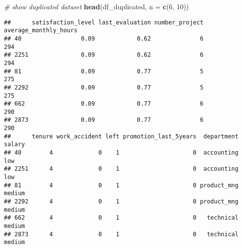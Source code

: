 \documentclass[
]{article}
\newenvironment{Shaded}{\begin{snugshade}}{\end{snugshade}}
\newcommand{\AttributeTok}[1]{\textcolor[rgb]{0.13,0.29,0.53}{#1}}
\newcommand{\CommentTok}[1]{\textcolor[rgb]{0.56,0.35,0.01}{\textit{#1}}}
\newcommand{\DecValTok}[1]{\textcolor[rgb]{0.00,0.00,0.81}{#1}}
\newcommand{\FunctionTok}[1]{\textcolor[rgb]{0.13,0.29,0.53}{\textbf{#1}}}
\newcommand{\NormalTok}[1]{#1}
\newcommand{\OtherTok}[1]{\textcolor[rgb]{0.56,0.35,0.01}{#1}}
\newcommand{\SpecialCharTok}[1]{\textcolor[rgb]{0.81,0.36,0.00}{\textbf{#1}}}
\newcommand{\StringTok}[1]{\textcolor[rgb]{0.31,0.60,0.02}{#1}}
\begin{document}
\begin{Shaded}
\end{Shaded}

\begin{Shaded}
\begin{Highlighting}[]
\CommentTok{\# show duplicated dataset}
\FunctionTok{head}\NormalTok{(df\_duplicated, }\AttributeTok{n =} \FunctionTok{c}\NormalTok{(}\DecValTok{6}\NormalTok{, }\DecValTok{10}\NormalTok{))}
\end{Highlighting}
\end{Shaded}

\begin{verbatim}
##      satisfaction_level last_evaluation number_project average_monthly_hours
## 40                 0.09            0.62              6                   294
## 2251               0.09            0.62              6                   294
## 81                 0.09            0.77              5                   275
## 2292               0.09            0.77              5                   275
## 662                0.09            0.77              6                   290
## 2873               0.09            0.77              6                   290
##      tenure work_accident left promotion_last_5years  department salary
## 40        4             0    1                     0  accounting    low
## 2251      4             0    1                     0  accounting    low
## 81        4             0    1                     0 product_mng medium
## 2292      4             0    1                     0 product_mng medium
## 662       4             0    1                     0   technical medium
## 2873      4             0    1                     0   technical medium
\end{verbatim}
\end{document}
